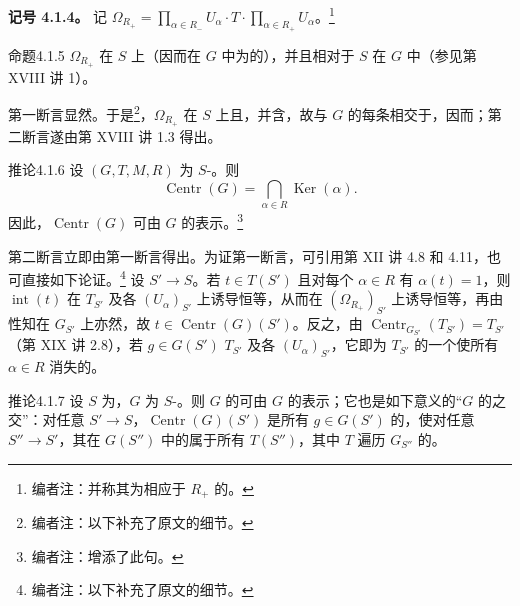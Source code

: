 \textbf{记号 4.1.4。} 记 $\Omega_{R_+}=\prod_{\alpha\in R_-}U_\alpha\cdot T\cdot\prod_{\alpha\in R_+}U_\alpha$。\footnote{编者注：并称其为相应于 $R_+$ 的。}
\begin{SGAresult}{命题}{4.1.5}  $\Omega_{R_+}$ 在 $S$ 上（因而在 $G$ 中为的），并且相对于 $S$ 在 $G$ 中（参见第 XVIII 讲 1）。\end{SGAresult}
第一断言显然。于是\footnote{编者注：以下补充了原文的细节。}，$\Omega_{R_+}$ 在 $S$ 上且，并含，故与 $G$ 的每条相交于，因而；第二断言遂由第 XVIII 讲 1.3 得出。
\begin{SGAresult}{推论}{4.1.6} 设 $(G,T,M,R)$ 为 $S$-。则
\[\operatorname{Centr}(G)=\bigcap_{\alpha\in R}\operatorname{Ker}(\alpha).\]
因此，$\operatorname{Centr}(G)$ 可由 $G$ 的表示。\footnote{编者注：增添了此句。}\end{SGAresult}
第二断言立即由第一断言得出。为证第一断言，可引用第 XII 讲 4.8 和 4.11，也可直接如下论证。\footnote{编者注：以下补充了原文的细节。} 设 $S'\to S$。若 $t\in T(S')$ 且对每个 $\alpha\in R$ 有 $\alpha(t)=1$，则 $\operatorname{int}(t)$ 在 $T_{S'}$ 及各 $(U_\alpha)_{S'}$ 上诱导恒等，从而在 $(\Omega_{R_+})_{S'}$ 上诱导恒等，再由性知在 $G_{S'}$ 上亦然，故 $t\in\operatorname{Centr}(G)(S')$。反之，由 $\operatorname{Centr}_{G_{S'}}(T_{S'})=T_{S'}$（第 XIX 讲 2.8），若 $g\in G(S')$  $T_{S'}$ 及各 $(U_\alpha)_{S'}$，它即为 $T_{S'}$ 的一个使所有 $\alpha\in R$ 消失的。
\begin{SGAresult}{推论}{4.1.7} 设 $S$ 为，$G$ 为 $S$-。则 $G$ 的可由 $G$ 的表示；它也是如下意义的“$G$ 的之交”：对任意 $S'\to S$，$\operatorname{Centr}(G)(S')$ 是所有 $g\in G(S')$ 的，使对任意 $S''\to S'$，其在 $G(S'')$ 中的属于所有 $T(S'')$，其中 $T$ 遍历 $G_{S''}$ 的。\end{SGAresult}
